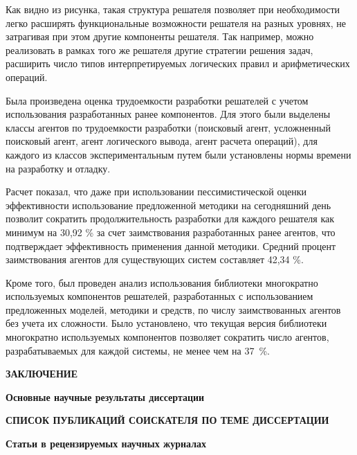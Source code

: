 \documentclass{thesisby}
\begin{document}
\vspace{-3mm}

Как видно из рисунка, такая структура решателя позволяет при необходимости легко расширять функциональные возможности решателя на разных уровнях, не затрагивая при этом другие компоненты решателя. Так например, можно реализовать в рамках того же решателя другие стратегии решения задач, расширить число типов интерпретируемых логических правил и арифметических операций.

Была произведена оценка трудоемкости разработки решателей с учетом использования разработанных ранее компонентов. Для этого были выделены классы агентов по трудоемкости разработки (поисковый агент, усложненный поисковый агент, агент логического вывода, агент расчета операций), для каждого из классов экспериментальным путем были установлены нормы времени на разработку и отладку.

Расчет показал, что даже при использовании пессимистической оценки эффективности использование предложенной методики на сегодняшний день позволит сократить продолжительность разработки для каждого решателя как минимум на 30,92 \% за счет заимствования разработанных ранее агентов, что подтверждает эффективность применения данной методики. Средний процент заимствования агентов для существующих систем составляет 42,34 \%. 

Кроме того, был проведен анализ использования библиотеки многократно используемых компонентов решателей, разработанных с использованием предложенных моделей, методики и средств, по числу заимствованных агентов без учета их сложности. Было установлено, что текущая версия библиотеки многократно используемых компонентов позволяет сократить число агентов, разрабатываемых для каждой системы, не менее чем на 37~\%.

\bigskip
\centerline{\bf ЗАКЛЮЧЕНИЕ}
\smallskip
{\bf Основные научные результаты диссертации}
\smallskip



\medskip




\def\selectlanguageifdefined#1{
\expandafter\ifx\csname date#1\endcsname\relax
\else\language\csname l@#1\endcsname\fi}

\bigskip
\centerline{\bf СПИСОК ПУБЛИКАЦИЙ СОИСКАТЕЛЯ ПО ТЕМЕ ДИССЕРТАЦИИ}

\vspace{1mm}
{\bf Статьи в рецензируемых научных журналах}
\vspace{2mm}
\end{document}
